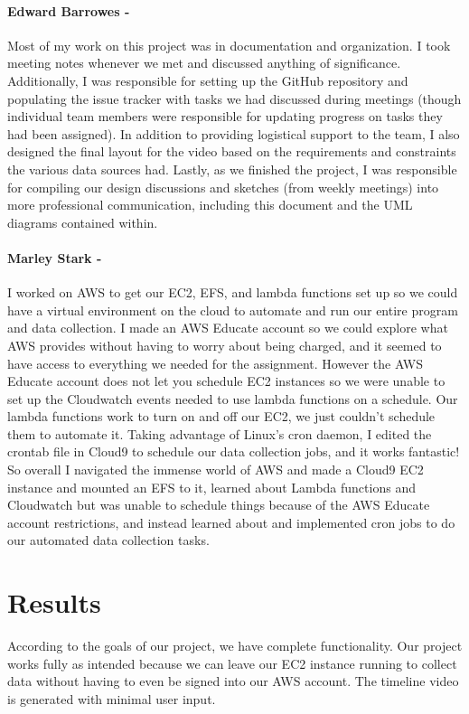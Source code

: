 \documentclass{article}
\begin{document}
    \paragraph{Edward Barrowes -}
    Most of my work on this project was in documentation and organization. I took meeting notes whenever we met and discussed anything of significance. Additionally, I was responsible for setting up the GitHub repository and populating the issue tracker with tasks we had discussed during meetings (though individual team members were responsible for updating progress on tasks they had been assigned). In addition to providing logistical support to the team, I also designed the final layout for the video based on the requirements and constraints the various data sources had. Lastly, as we finished the project, I was responsible for compiling our design discussions and sketches (from weekly meetings) into more professional communication, including this document and the UML diagrams contained within.
    \paragraph{Marley Stark -}
    I worked on AWS to get our EC2, EFS, and lambda functions set up so we could have a virtual environment on the cloud to automate and run our entire program and data collection. I made an AWS Educate account so we could explore what AWS provides without having to worry about being charged, and it seemed to have access to everything we needed for the assignment. However the AWS Educate account does not let you schedule EC2 instances so we were unable to set up the Cloudwatch events needed to use lambda functions on a schedule. Our lambda functions work to turn on and off our EC2, we just couldn’t schedule them to automate it. Taking advantage of Linux’s cron daemon, I edited the crontab file in Cloud9 to schedule our data collection jobs, and it works fantastic! So overall I navigated the immense world of AWS and made a Cloud9 EC2 instance and mounted an EFS to it, learned about Lambda functions and Cloudwatch but was unable to schedule things because of the AWS Educate account restrictions, and instead learned about and implemented cron jobs to do our automated data collection tasks.
\section{Results}
  According to the goals of our project, we have complete functionality. Our project works fully as intended because we can leave our EC2 instance running to collect data without having to even be signed into our AWS account. The timeline video is generated with minimal user input.
\end{document}
